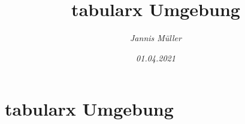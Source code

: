 \documentclass[a4paper, 15pt]{article}
\title{tabularx Umgebung}
\date{\slshape 01.04.2021}
\author{\slshape Jannis Müller}
\begin{document}
\section*{tabularx Umgebung}
\end{document}
